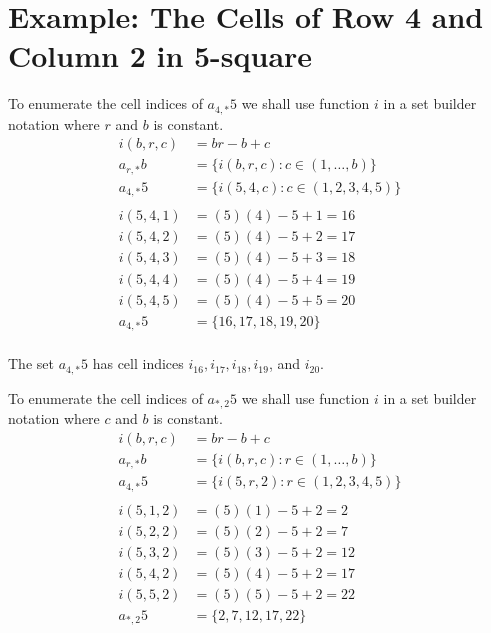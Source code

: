\documentclass[letterpaper, twoside,12pt]{book}
\begin{document}
    \section{Example: The Cells of Row 4 and Column 2 in 5-square} \label{2_example_1}
    To enumerate the cell indices of $a_{4,*}5$ we shall use function $i$ in a set builder notation where $r$ and $b$ is constant.
    \begin{equation*}
        \begin{split}
            i(b,r,c) &= br - b + c \\
            a_{r,*}b &= \{ i(b,r,c) : c \in (1, \dots, b) \} \\
            a_{4,*}5 &= \{ i(5,4,c) : c \in (1,2,3,4,5) \} \\
            \\
            i(5,4,1) &= (5)(4) - 5 + 1 = 16 \\
            i(5,4,2) &= (5)(4) - 5 + 2 = 17 \\
            i(5,4,3) &= (5)(4) - 5 + 3 = 18 \\
            i(5,4,4) &= (5)(4) - 5 + 4 = 19 \\
            i(5,4,5) &= (5)(4) - 5 + 5 = 20 \\
            a_{4,*}5 &= \{16, 17, 18, 19, 20 \} \\
        \end{split}
    \end{equation*}

    The set $a_{4,*}5$ has cell indices $i_{16}, i_{17}, i_{18}, i_{19}$, and $i_{20}$.

    To enumerate the cell indices of $a_{*,2}5$ we shall use function $i$ in a set builder notation where $c$ and $b$ is constant.
    \begin{equation*}
        \begin{split}
            i(b,r,c) &= br - b + c \\
            a_{r,*}b &= \{ i(b,r,c) : r \in (1, \dots, b) \} \\
            a_{4,*}5 &= \{ i(5,r,2) : r \in (1,2,3,4,5) \} \\
            \\
            i(5,1,2) &= (5)(1) - 5 + 2 = 2 \\
            i(5,2,2) &= (5)(2) - 5 + 2 = 7 \\
            i(5,3,2) &= (5)(3) - 5 + 2 = 12 \\
            i(5,4,2) &= (5)(4) - 5 + 2 = 17 \\
            i(5,5,2) &= (5)(5) - 5 + 2 = 22 \\
            a_{*,2}5 &= \{2, 7, 12, 17, 22 \} \\
        \end{split}
    \end{equation*}
\end{document}
